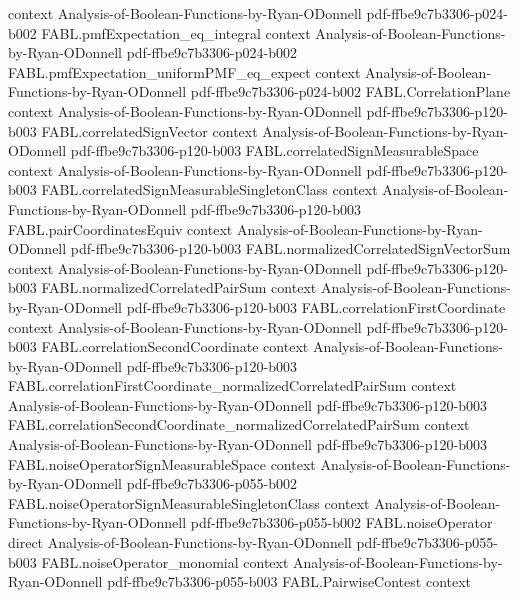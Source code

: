 \begin{theorem}
  {context}
  {Analysis-of-Boolean-Functions-by-Ryan-ODonnell}
  {pdf-ffbe9c7b3306-p024-b002}
\proofstep
  {FABL.pmfExpectation_eq_integral}
  {context}
  {Analysis-of-Boolean-Functions-by-Ryan-ODonnell}
  {pdf-ffbe9c7b3306-p024-b002}
\proofstep
  {FABL.pmfExpectation_uniformPMF_eq_expect}
  {context}
  {Analysis-of-Boolean-Functions-by-Ryan-ODonnell}
  {pdf-ffbe9c7b3306-p024-b002}
\proofstep
  {FABL.CorrelationPlane}
  {context}
  {Analysis-of-Boolean-Functions-by-Ryan-ODonnell}
  {pdf-ffbe9c7b3306-p120-b003}
\proofstep
  {FABL.correlatedSignVector}
  {context}
  {Analysis-of-Boolean-Functions-by-Ryan-ODonnell}
  {pdf-ffbe9c7b3306-p120-b003}
\proofstep
  {FABL.correlatedSignMeasurableSpace}
  {context}
  {Analysis-of-Boolean-Functions-by-Ryan-ODonnell}
  {pdf-ffbe9c7b3306-p120-b003}
\proofstep
  {FABL.correlatedSignMeasurableSingletonClass}
  {context}
  {Analysis-of-Boolean-Functions-by-Ryan-ODonnell}
  {pdf-ffbe9c7b3306-p120-b003}
\proofstep
  {FABL.pairCoordinatesEquiv}
  {context}
  {Analysis-of-Boolean-Functions-by-Ryan-ODonnell}
  {pdf-ffbe9c7b3306-p120-b003}
\proofstep
  {FABL.normalizedCorrelatedSignVectorSum}
  {context}
  {Analysis-of-Boolean-Functions-by-Ryan-ODonnell}
  {pdf-ffbe9c7b3306-p120-b003}
\proofstep
  {FABL.normalizedCorrelatedPairSum}
  {context}
  {Analysis-of-Boolean-Functions-by-Ryan-ODonnell}
  {pdf-ffbe9c7b3306-p120-b003}
\proofstep
  {FABL.correlationFirstCoordinate}
  {context}
  {Analysis-of-Boolean-Functions-by-Ryan-ODonnell}
  {pdf-ffbe9c7b3306-p120-b003}
\proofstep
  {FABL.correlationSecondCoordinate}
  {context}
  {Analysis-of-Boolean-Functions-by-Ryan-ODonnell}
  {pdf-ffbe9c7b3306-p120-b003}
\proofstep
  {FABL.correlationFirstCoordinate_normalizedCorrelatedPairSum}
  {context}
  {Analysis-of-Boolean-Functions-by-Ryan-ODonnell}
  {pdf-ffbe9c7b3306-p120-b003}
\proofstep
  {FABL.correlationSecondCoordinate_normalizedCorrelatedPairSum}
  {context}
  {Analysis-of-Boolean-Functions-by-Ryan-ODonnell}
  {pdf-ffbe9c7b3306-p120-b003}
\proofstep
  {FABL.noiseOperatorSignMeasurableSpace}
  {context}
  {Analysis-of-Boolean-Functions-by-Ryan-ODonnell}
  {pdf-ffbe9c7b3306-p055-b002}
\proofstep
  {FABL.noiseOperatorSignMeasurableSingletonClass}
  {context}
  {Analysis-of-Boolean-Functions-by-Ryan-ODonnell}
  {pdf-ffbe9c7b3306-p055-b002}
\proofstep
  {FABL.noiseOperator}
  {direct}
  {Analysis-of-Boolean-Functions-by-Ryan-ODonnell}
  {pdf-ffbe9c7b3306-p055-b003}
\proofstep
  {FABL.noiseOperator_monomial}
  {context}
  {Analysis-of-Boolean-Functions-by-Ryan-ODonnell}
  {pdf-ffbe9c7b3306-p055-b003}
\proofstep
  {FABL.PairwiseContest}
  {context}

\end{theorem}
